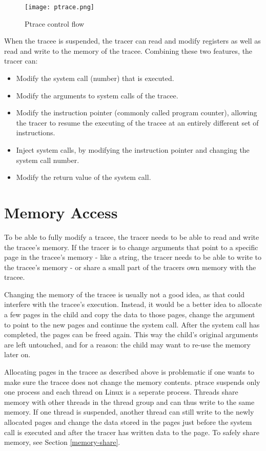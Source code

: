 \documentclass[a4paper, 10pt]{report}
\begin{document}
\begin{figure}
\texttt{[image: ptrace.png]}
\caption{Ptrace control flow}
\label{fig1}
\end{figure}

When the tracee is suspended, the tracer can read and modify registers as well
as read and write to the memory of the tracee. Combining these two features,
the tracer can:

\begin{itemize}
\item Modify the system call (number) that is executed.
\item Modify the arguments to system calls of the tracee.
\item Modify the instruction pointer (commonly called program counter), allowing
    the tracer to resume the executing of the tracee at an entirely
    different set of instructions.
\item Inject system calls, by modifying the instruction pointer and changing the
    system call number.
\item Modify the return value of the system call.
\end{itemize}

\section{Memory Access}

To be able to fully modify a tracee, the tracer needs to be able to
read and write the tracee's memory. If the tracer is to change
arguments that point to a specific page in the tracee's memory - like a string,
the tracer needs to be able to write to the tracee's memory - or
share a small part of the tracers own memory with the tracee.

Changing the memory of the tracee is usually not a good idea, as that could
interfere with the tracee's execution.
Instead, it would be a better idea to allocate a few pages in the
child and copy the data to those pages, change the argument to point to the new
pages and continue the system call. After the system call has completed, the
pages can be freed again. This way the child's original arguments are left
untouched, and for a reason: the child may want to re-use the memory later on.

Allocating pages in the tracee as described above is problematic if one wants
to make sure the tracee does not change the memory contents. ptrace suspends
only one process and each thread on Linux is a seperate process. Threads share
memory with other threads in the thread group and can thus write to the same
memory. If one thread is suspended, another thread can still write to the newly
allocated pages and change the data stored in the pages just before the system
call is executed and after the tracer has written data to the page. To safely
share memory, see Section \ref{memory-share}.
\end{document}
